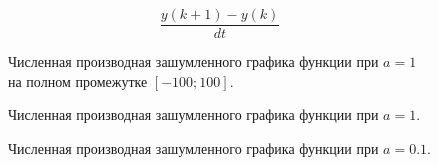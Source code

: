 \documentclass[a5paper, 10pt]{article}
\theoremstyle{definition}
\theoremstyle{plain}
\theoremstyle{remark}
\begin{document}
\begin{equation}
\frac{y(k+1) - y(k)}{dt}
\end{equation}

\begin{figure}[h!]
\caption{Численная производная зашумленного графика функции при $a=1$ на полном промежутке $[-100; 100]$.}
\end{figure}

\begin{figure}[h!]
\caption{Численная производная зашумленного графика функции при $a=1$.}
\caption{Численная производная зашумленного графика функции при $a=0.1$.}
\end{figure}
\end{document}
